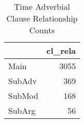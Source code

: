 \begin{table}[htbp!]
\centering
\caption{Time Adverbial Clause Relationship Counts}
\label{table:rel_ct}
\begin{tabular}{lr}
\toprule
{} &  cl\_rela \\
\midrule
Main   &     3055 \\
SubAdv &      369 \\
SubMod &      168 \\
SubArg &       56 \\
\bottomrule
\end{tabular}
\end{table}

